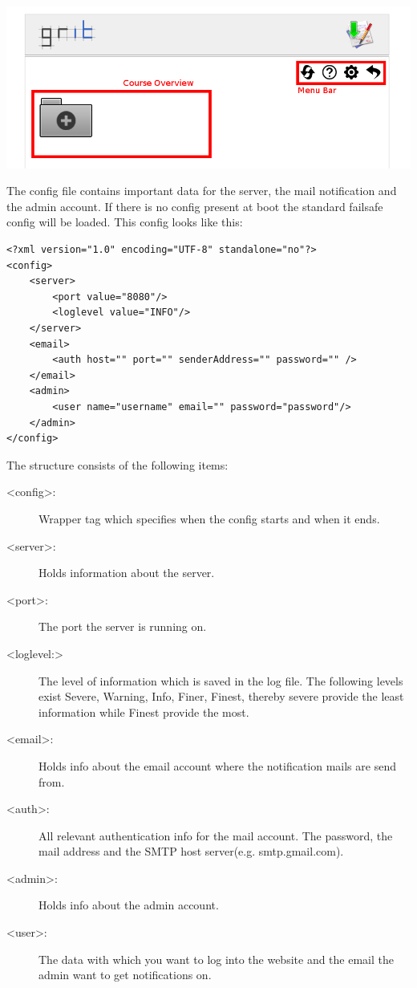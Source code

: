 \documentclass[10pt,a4paper, titlepage, toc=idx]{scrreprt}
\theoremstyle{definition}
\theoremstyle{plain}
\begin{document}
\begin{center}
   \includegraphics[width=.6\textwidth]{pictures/home.png}
\end{center}	

The config file contains important data for the server, the mail notification and the admin account. If there is no config present at boot the standard failsafe config will be loaded. This config looks like this:
		
\begin{lstlisting}
<?xml version="1.0" encoding="UTF-8" standalone="no"?>
<config>
	<server>
		<port value="8080"/>
		<loglevel value="INFO"/>
	</server>
	<email>
		<auth host="" port="" senderAddress="" password="" />
	</email>
	<admin>
		<user name="username" email="" password="password"/>
	</admin>
</config>
 \end{lstlisting}
       	The structure consists of the following items:
       	\begin{description}
        \item[<config>:] Wrapper tag which specifies when the config starts and when it ends.
        \item[<server>:] Holds information about the server. 
        \item[<port>:] The port the server is running on.
        \item[<loglevel:>] The level of information which is saved in the log file. The following levels exist Severe, Warning, Info, Finer, Finest, thereby severe provide the least information while Finest provide the most.
        \item[<email>:] Holds info about the email account where the notification mails are send from.
        \item[<auth>:] All relevant authentication info for the mail account. The password, the mail address and the SMTP host server(e.g. smtp.gmail.com).
        \item[<admin>:] Holds info about the admin account.
        \item[<user>:] The data with which you want to log into the website and the email the admin want to get notifications on.
		\end{description}
		
\end{document}
